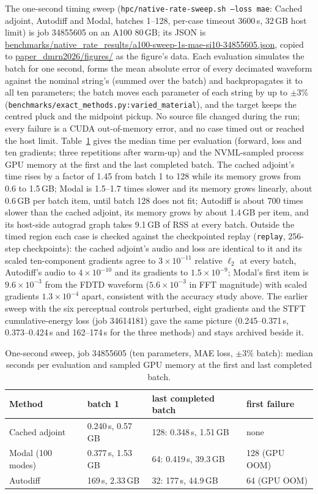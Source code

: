 \documentclass[a4paper,10pt]{article}
\begin{document}
The one-second timing sweep (\texttt{hpc/native-rate-sweep.sh --loss mae}: Cached adjoint, Autodiff and Modal, batches 1--128, per-case timeout 3600\,s, 32\,GB host limit) is job 34855605 on an A100 80\,GB; its JSON is \url{benchmarks/native_rate_results/a100-sweep-1s-mae-si10-34855605.json}, copied to \url{paper_dmrn2026/figures/} as the figure's data. Each evaluation simulates the batch for one second, forms the mean absolute error of every decimated waveform against the nominal string's (summed over the batch) and backpropagates it to all ten parameters; the batch moves each parameter of each string by up to $\pm3\%$ (\texttt{benchmarks/exact\_methods.py:varied\_material}), and the target keeps the centred pluck and the midpoint pickup. No source file changed during the run; every failure is a CUDA out-of-memory error, and no case timed out or reached the host limit. Table~\ref{tab:sweep} gives the median time per evaluation (forward, loss and ten gradients; three repetitions after warm-up) and the NVML-sampled process GPU memory at the first and the last completed batch. The cached adjoint's time rises by a factor of 1.45 from batch 1 to 128 while its memory grows from 0.6 to 1.5\,GB; Modal is 1.5--1.7 times slower and its memory grows linearly, about 0.6\,GB per batch item, until batch 128 does not fit; Autodiff is about 700 times slower than the cached adjoint, its memory grows by about 1.4\,GB per item, and its host-side autograd graph takes 9.1\,GB of RSS at every batch. Outside the timed region each case is checked against the checkpointed replay (\texttt{replay}, 256-step checkpoints): the cached adjoint's audio and loss are identical to it and its scaled ten-component gradients agree to $3\times10^{-11}$ relative $\ell_2$ at every batch, Autodiff's audio to $4\times10^{-10}$ and its gradients to $1.5\times10^{-9}$; Modal's first item is $9.6\times10^{-3}$ from the FDTD waveform ($5.6\times10^{-3}$ in FFT magnitude) with scaled gradients $1.3\times10^{-4}$ apart, consistent with the accuracy study above. The earlier sweep with the six perceptual controls perturbed, eight gradients and the STFT cumulative-energy loss (job 34614181) gave the same picture (0.245--0.371\,s, 0.373--0.424\,s and 162--174\,s for the three methods) and stays archived beside it.

\begin{table}[ht]
\centering\small
\begin{tabular}{llll}
\hline
Method & batch 1 & last completed batch & first failure \\
\hline
Cached adjoint & 0.240\,s, 0.57\,GB & 128: 0.348\,s, 1.51\,GB & none \\
Modal (100 modes) & 0.377\,s, 1.53\,GB & 64: 0.419\,s, 39.3\,GB & 128 (GPU OOM) \\
Autodiff & 169\,s, 2.33\,GB & 32: 177\,s, 44.9\,GB & 64 (GPU OOM) \\
\hline
\end{tabular}
\caption{One-second sweep, job 34855605 (ten parameters, MAE loss, $\pm3\%$ batch): median seconds per evaluation and sampled GPU memory at the first and last completed batch.}
\label{tab:sweep}
\end{table}



\end{document}
